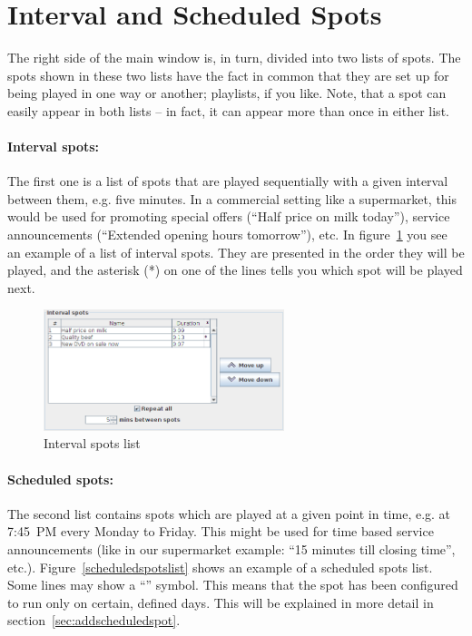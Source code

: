 \documentclass[a4paper,12pt]{report}
\begin{document}
\section{Interval and Scheduled Spots}
The right side of the main window is, in turn, divided into two lists of spots.
The spots shown in these two lists have the fact in common that they are set up
for being played in one way or another; playlists, if you like. Note, that a
spot can easily appear in both lists -- in fact, it can appear more than once in
either list.

\paragraph{Interval spots:} The first one is a list of spots that are played
sequentially with a given interval between them, e.g. five minutes. In a
commercial setting like a supermarket, this would be used for promoting special
offers (``Half price on milk today''), service announcements (``Extended opening
hours tomorrow''), etc. In figure~\ref{intervalspotslist} you see an example of
a list of interval spots. They are presented in the order they will be played,
and the asterisk (*) on one of the lines tells you which spot will be played
next.

\begin{figure}[h]
\centering \includegraphics[width=70mm]{intervalspotslist.png}
\caption{Interval spots list}
\label{intervalspotslist}
\end{figure}

\paragraph{Scheduled spots:} The second list contains spots which are played at
a given point in time, e.g. at 7:45~PM every Monday to Friday. This might be
used for time based service announcements (like in our supermarket example: ``15
minutes till closing time'', etc.). Figure~\ref{scheduledspotslist} shows an
example of a scheduled spots list. Some lines may show a ``\textcurrency''
symbol. This means that the spot has been configured to run only on certain,
defined days. This will be explained in more detail in
section~\ref{sec:addscheduledspot}.
\end{document}
